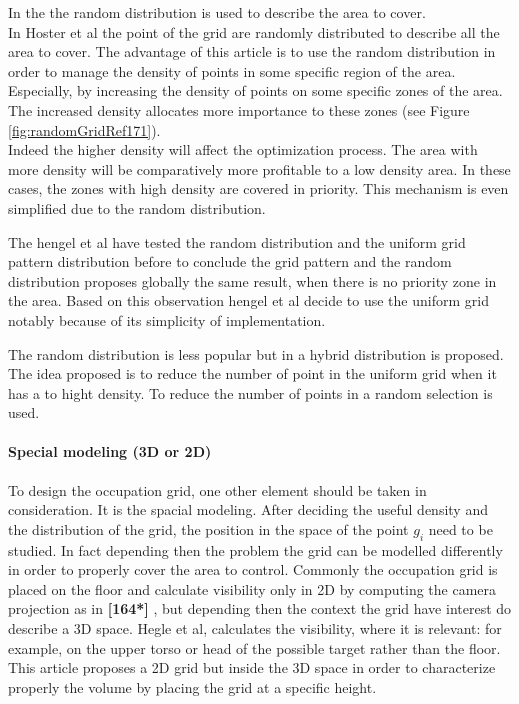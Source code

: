  In the  \cite{83*van2009,171*horster2006} the random distribution is used to describe the area to cover. \\
In Hoster et al \citep{171*horster2006} the point of the grid are randomly distributed to describe all the area to cover. The advantage of this article is to use the random distribution in order to manage the density of points in some specific region of the area. Especially, by increasing the density of points on some specific zones of the area. The increased density allocates more importance to these zones (see Figure \ref{fig:randomGridRef171}).\\
Indeed the higher density will affect the optimization process. The area with more density will be comparatively more profitable to a low density area. In these cases, the zones with high density are covered in priority. This mechanism is even simplified due to the random distribution.

The hengel et al \cite{83*van2009} have tested the random distribution and the uniform grid pattern distribution before to conclude the grid pattern and the random distribution proposes globally the same result, when there is no priority zone in the area. Based on this observation hengel et al \cite{83*van2009} decide to use the uniform grid notably because of its simplicity of implementation.

The random distribution is less popular but in \cite{22*zhao2008} a hybrid distribution is proposed. The idea proposed is to reduce the number of point in the uniform grid when it has a to hight density. To reduce the number of points in a random  selection is used. 



\paragraph*{ Special modeling (3D  or 2D)}
To design the occupation grid, one other element should be taken in consideration. It is the spacial modeling. After deciding the useful density and the distribution of the grid, the position in the space of the point $g_i$ need to be studied.  
In fact depending then the problem the grid can be modelled differently in order to properly cover the area to control. Commonly the occupation grid is placed on the floor and calculate visibility only in 2D  by computing the  camera projection as in \textbf{[164*]} \citep{164*valente2013,150*chakrabarty2002,8*zhou2011,170*yabuta2008,171*horster2006,22*zhao2008}, but depending then the context the grid have interest do describe a 3D space.  
Hegle et al\cite{83*van2009}, calculates the visibility, where it is relevant: for example, on the upper torso or head of the possible target rather than the floor. This article  proposes a 2D grid but inside the 3D space in order to  characterize properly the volume by placing the grid at a specific height.  

